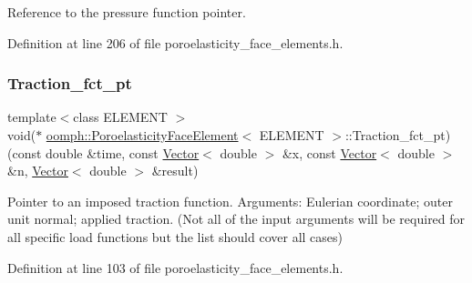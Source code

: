 Reference to the pressure function pointer. 



Definition at line 206 of file poroelasticity\+\_\+face\+\_\+elements.\+h.

\mbox{\label{classoomph_1_1PoroelasticityFaceElement_a5b6babb5cb6ced6a3928617730eafb83}} 
\subsubsection{\texorpdfstring{Traction\+\_\+fct\+\_\+pt}{Traction\_fct\_pt}}
{\footnotesize\ttfamily template$<$class E\+L\+E\+M\+E\+NT $>$ \\
void($\ast$ \hyperlink{classoomph_1_1PoroelasticityFaceElement}{oomph\+::\+Poroelasticity\+Face\+Element}$<$ E\+L\+E\+M\+E\+NT $>$\+::Traction\+\_\+fct\+\_\+pt) (const double \&time, const \hyperlink{classoomph_1_1Vector}{Vector}$<$ double $>$ \&x, const \hyperlink{classoomph_1_1Vector}{Vector}$<$ double $>$ \&n, \hyperlink{classoomph_1_1Vector}{Vector}$<$ double $>$ \&result)\hspace{0.3cm}{\ttfamily [protected]}}



Pointer to an imposed traction function. Arguments\+: Eulerian coordinate; outer unit normal; applied traction. (Not all of the input arguments will be required for all specific load functions but the list should cover all cases) 



Definition at line 103 of file poroelasticity\+\_\+face\+\_\+elements.\+h.

\mbox{\label{classoomph_1_1PoroelasticityFaceElement_a50f847881ebe385a49e7e31bf2e84985}} 
